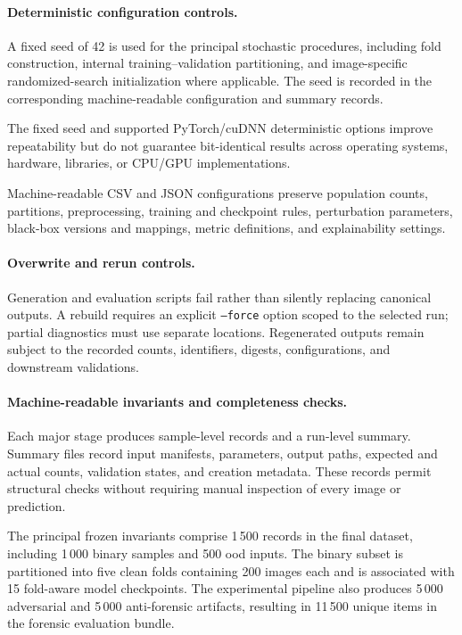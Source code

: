 \paragraph{Deterministic configuration controls.}

A fixed seed of 42 is used for the principal stochastic procedures, including
fold construction, internal training--validation partitioning, and
image-specific randomized-search initialization where applicable. The seed is
recorded in the corresponding machine-readable configuration and summary
records.

The fixed seed and supported PyTorch/cuDNN deterministic options improve
repeatability but do not guarantee bit-identical results across operating
systems, hardware, libraries, or CPU/GPU implementations.

Machine-readable CSV and JSON configurations preserve population counts,
partitions, preprocessing, training and checkpoint rules, perturbation
parameters, black-box versions and mappings, metric definitions, and
explainability settings.

\paragraph{Overwrite and rerun controls.}

Generation and evaluation scripts fail rather than silently replacing canonical
outputs. A rebuild requires an explicit \texttt{--force} option scoped to the
selected run; partial diagnostics must use separate locations. Regenerated
outputs remain subject to the recorded counts, identifiers, digests,
configurations, and downstream validations.

\paragraph{Machine-readable invariants and completeness checks.}

Each major stage produces sample-level records and a run-level summary. Summary
files record input manifests, parameters, output paths, expected and actual
counts, validation states, and creation metadata. These records permit
structural checks without requiring manual inspection of every image or
prediction.

The principal frozen invariants comprise 1\,500 records in the final dataset,
including 1\,000 binary samples and 500 \gls{ood} inputs. The binary subset is
partitioned into five clean folds containing 200 images each and is associated
with 15 fold-aware model checkpoints. The experimental pipeline also
produces 5\,000 adversarial and 5\,000 anti-forensic artifacts, resulting in
11\,500 unique items in the forensic evaluation bundle.

